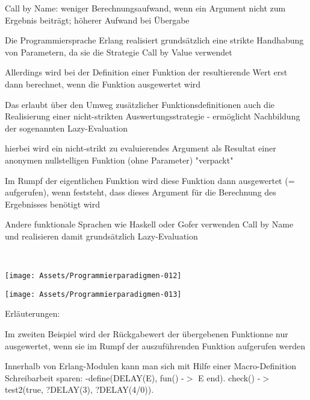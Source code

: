 \documentclass[10pt]{article}
\begin{document}
\begin{itemize*}
\begin{itemize*}
\begin{itemize*}
    \item Call by Name: weniger Berechnungsaufwand, wenn ein Argument nicht zum Ergebnis beiträgt; höherer Aufwand bei Übergabe
  \end{itemize*}
  \item Die Programmiersprache Erlang realisiert grundsätzlich eine strikte Handhabung von Parametern, da sie die Strategie Call by Value verwendet
  \item Allerdings wird bei der Definition einer Funktion der resultierende Wert erst dann berechnet, wenn die Funktion ausgewertet wird
  \begin{itemize*}
    \item Das erlaubt über den Umweg zusätzlicher Funktionsdefinitionen auch die Realisierung einer nicht-strikten Auswertungsstrategie - ermöglicht Nachbildung der sogenannten Lazy-Evaluation
    \item hierbei wird ein nicht-strikt zu evaluierendes Argument als Resultat einer anonymen nullstelligen Funktion (ohne Parameter) "verpackt"
    \item Im Rumpf der eigentlichen Funktion wird diese Funktion dann ausgewertet (= aufgerufen), wenn feststeht, dass dieses Argument für die Berechnung des Ergebnisses benötigt wird
    \item Andere funktionale Sprachen wie Haskell oder Gofer verwenden Call by Name und realisieren damit grundsätzlich Lazy-Evaluation
  \end{itemize*}
  \ \linebreak 
  \begin{center}
    \centering
    \texttt{[image: Assets/Programmierparadigmen-012]}
  \end{center}
  \begin{center}
    \centering
    \texttt{[image: Assets/Programmierparadigmen-013]}
  \end{center}
  \item Erläuterungen:
  \begin{itemize*}
    \item Im zweiten Beispiel wird der Rückgabewert der übergebenen Funktionne nur ausgewertet, wenn sie im Rumpf der auszuführenden Funktion aufgerufen werden
    \item Innerhalb von Erlang-Modulen kann man sich mit Hilfe einer Macro-Definition Schreibarbeit sparen: \newline -define(DELAY(E), fun() -$>$ E end). \newline check() -$>$ test2(true, ?DELAY(3), ?DELAY(4/0)).

\end{itemize*}
\end{itemize*}
\end{itemize*}
\end{document}

